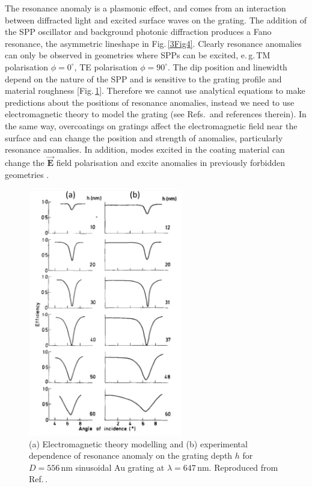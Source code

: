 The resonance anomaly is a plasmonic effect, and comes from an interaction between diffracted light and excited surface waves on the grating. The addition of the SPP oscillator and background photonic diffraction produces a Fano resonance, the asymmetric lineshape in Fig.\,\ref{3Fig4}. Clearly resonance anomalies can only be observed in geometries where SPPs can be excited, e.\,g.\,TM polarisation $\phi=0^{\circ}$, TE polarisation $\phi=90^{\circ}$. The dip position and linewidth depend on the nature of the SPP and is sensitive to the grating profile and material roughness [Fig.\,\ref{3Fig5}]. Therefore we cannot use analytical equations to make predictions about the positions of resonance anomalies, instead we need to use electromagnetic theory to model the grating (see Refs.\,\cite{Hutley1982, Loewen1997} and references therein). In the same way, overcoatings on gratings affect the electromagnetic field near the surface and can change the position and strength of anomalies, particularly resonance anomalies. In addition, modes excited in the coating material can change the $\vec{\mathbf{E}}$ field polarisation and excite anomalies in previously forbidden geometries \cite{Hutley1982, Loewen1997}.
\begin{figure}[h!] 
\centering    
\includegraphics[width=0.6\textwidth]{Fig5}
\caption{(a) Electromagnetic theory modelling and (b) experimental dependence of resonance anomaly on the grating depth $h$ for $D=556$\,nm sinusoidal Au grating at $\lambda=647$\,nm. Reproduced from Ref.\,\cite{Hutley1976}. }
\label{3Fig5}
\end{figure}



